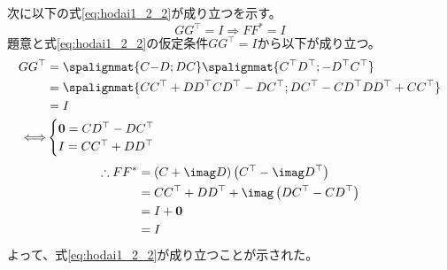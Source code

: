 \documentclass[dvipdfmx,titlepage, 11pt, a4paper]{jsarticle}%
\begin{document}
\begin{enumerate}[(1)]
    次に以下の式\eqref{eq:hodai1_2_2}が成り立つを示す。
    \begin{equation}
        GG^{\top} = I \Rightarrow FF^{\ast} = I \label{eq:hodai1_2_2}
    \end{equation}
    題意と式\eqref{eq:hodai1_2_2}の仮定条件$GG^{\top} = I$から以下が成り立つ。
    \begin{align*}
        GG^{\top} & = 
        \spalignmat{
            C {-D};
            D {C}
        }
        \spalignmat{
            {C^{\top}} {D^{\top}};
            {-D^{\top}} {C^{\top}}
        }\\
        & = 
        \spalignmat{
            {CC^{\top} + DD^{\top}} {CD^{\top} - DC^{\top}};
            {DC^{\top} - CD^{\top}} {DD^{\top} + CC^{\top}}
        }\\
        & = I\\
        \Longleftrightarrow &
        \begin{cases}
            \mbox{\boldmath $0$} = CD^{\top} - DC^{\top}\\
            I = CC^{\top} + DD^{\top}
        \end{cases}
    \end{align*}
    \begin{align*}
        \therefore FF^{\ast} & = \left(C + \imag D\right)\left(C^{\top} - \imag D^{\top}\right)\\
            & = CC^{\top} + DD^{\top} + \imag \left(DC^{\top} - CD^{\top}\right)\\
            & = I + \mbox{\boldmath $0$}\\
            & = I
    \end{align*}
    よって、式\eqref{eq:hodai1_2_2}が成り立つことが示された。


\end{enumerate}
\end{document}
